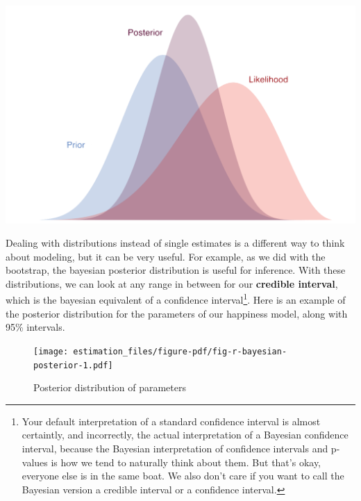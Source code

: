 \documentclass[
  letterpaper,
]{krantz}
\begin{document}
\includegraphics{img/prior2post_clean.png}

Dealing with distributions instead of single estimates is a different
way to think about modeling, but it can be very useful. For example, as
we did with the bootstrap, the bayesian posterior distribution is useful
for inference. With these distributions, we can look at any range in
between for our \textbf{credible interval}, which is the bayesian
equivalent of a confidence interval\footnote{Your default interpretation
  of a standard confidence interval is almost certaintly, and
  incorrectly, the actual interpretation of a Bayesian confidence
  interval, because the Bayesian interpretation of confidence intervals
  and p-values is how we tend to naturally think about them. But that's
  okay, everyone else is in the same boat. We also don't care if you
  want to call the Bayesian version a credible interval or a confidence
  interval.}. Here is an example of the posterior distribution for the
parameters of our happiness model, along with 95\% intervals.

\begin{figure}

{\centering \texttt{[image: estimation\_files/figure-pdf/fig-r-bayesian-posterior-1.pdf]}

}

\caption{\label{fig-r-bayesian-posterior}Posterior distribution of
parameters}

\end{figure}
\end{document}
